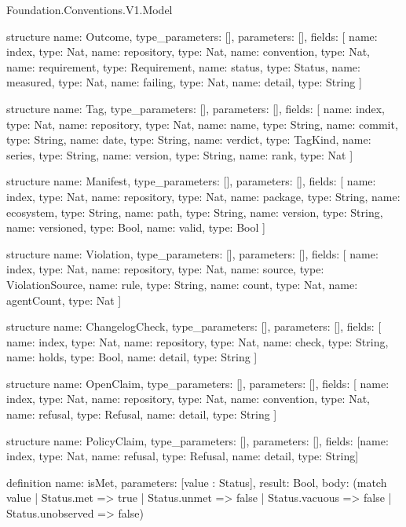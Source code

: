 \begin{lexlean}{Foundation.Conventions.V1.Model}
\begin{semanticmodule}
structure{
  name: Outcome,
  type_parameters: [],
  parameters: [],
  fields: [
    {name: index, type: Nat},
    {name: repository, type: Nat},
    {name: convention, type: Nat},
    {name: requirement, type: Requirement},
    {name: status, type: Status},
    {name: measured, type: Nat},
    {name: failing, type: Nat},
    {name: detail, type: String}
  ]
}

structure{
  name: Tag,
  type_parameters: [],
  parameters: [],
  fields: [
    {name: index, type: Nat},
    {name: repository, type: Nat},
    {name: name, type: String},
    {name: commit, type: String},
    {name: date, type: String},
    {name: verdict, type: TagKind},
    {name: series, type: String},
    {name: version, type: String},
    {name: rank, type: Nat}
  ]
}

structure{
  name: Manifest,
  type_parameters: [],
  parameters: [],
  fields: [
    {name: index, type: Nat},
    {name: repository, type: Nat},
    {name: package, type: String},
    {name: ecosystem, type: String},
    {name: path, type: String},
    {name: version, type: String},
    {name: versioned, type: Bool},
    {name: valid, type: Bool}
  ]
}

structure{
  name: Violation,
  type_parameters: [],
  parameters: [],
  fields: [
    {name: index, type: Nat},
    {name: repository, type: Nat},
    {name: source, type: ViolationSource},
    {name: rule, type: String},
    {name: count, type: Nat},
    {name: agentCount, type: Nat}
  ]
}

structure{
  name: ChangelogCheck,
  type_parameters: [],
  parameters: [],
  fields: [
    {name: index, type: Nat},
    {name: repository, type: Nat},
    {name: check, type: String},
    {name: holds, type: Bool},
    {name: detail, type: String}
  ]
}

structure{
  name: OpenClaim,
  type_parameters: [],
  parameters: [],
  fields: [
    {name: index, type: Nat},
    {name: repository, type: Nat},
    {name: convention, type: Nat},
    {name: refusal, type: Refusal},
    {name: detail, type: String}
  ]
}

structure{
  name: PolicyClaim,
  type_parameters: [],
  parameters: [],
  fields: [{name: index, type: Nat}, {name: refusal, type: Refusal}, {name: detail, type: String}]
}

definition{
  name: isMet,
  parameters: [value : Status],
  result: Bool,
  body: (match value
    | Status.met => true
    | Status.unmet => false
    | Status.vacuous => false
    | Status.unobserved => false)
}


\end{semanticmodule}
\end{lexlean}
